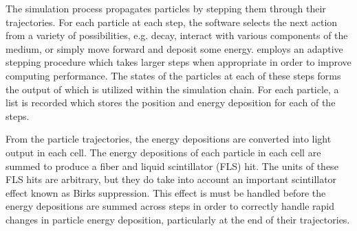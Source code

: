 The \geant simulation process propagates particles by stepping them through their trajectories.  For each particle at each step, the software selects the next action from a variety of possibilities, e.g. decay, interact with various components of the medium, or simply move forward and deposit some energy.  \geant employs an adaptive stepping procedure which takes larger steps when appropriate in order to improve computing performance.  The states of the particles at each of these steps forms the output of \geant which is utilized within the \nova simulation chain.  For each particle, a list is recorded which stores the position and energy deposition for each of the steps.

From the \geant particle trajectories, the energy depositions are converted into light output in each cell.  The energy depositions of each particle in each cell are summed to produce a fiber and liquid scintillator (FLS) hit.  The units of these FLS hits are arbitrary, but they do take into account an important scintillator effect known as Birks suppression. \cite{birks1951scintillations}  This effect is must be handled before the energy depositions are summed across steps in order to correctly handle rapid changes in particle energy deposition, particularly at the end of their trajectories.

